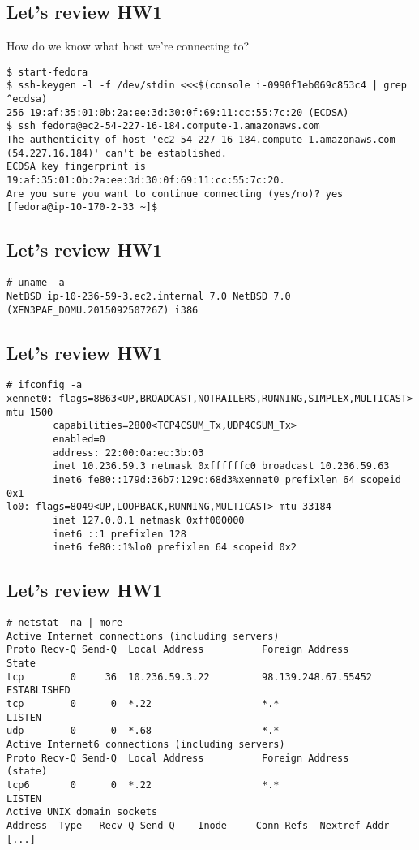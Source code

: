 \documentclass[xga]{xdvislides}
\begin{document}
\subsection{Let's review HW1}
\vspace{.5in}

How do we know what host we're connecting to?
\begin{verbatim}
$ start-fedora
$ ssh-keygen -l -f /dev/stdin <<<$(console i-0990f1eb069c853c4 | grep ^ecdsa)
256 19:af:35:01:0b:2a:ee:3d:30:0f:69:11:cc:55:7c:20 (ECDSA)
$ ssh fedora@ec2-54-227-16-184.compute-1.amazonaws.com
The authenticity of host 'ec2-54-227-16-184.compute-1.amazonaws.com
(54.227.16.184)' can't be established.
ECDSA key fingerprint is 19:af:35:01:0b:2a:ee:3d:30:0f:69:11:cc:55:7c:20.
Are you sure you want to continue connecting (yes/no)? yes
[fedora@ip-10-170-2-33 ~]$ 
\end{verbatim}

\subsection{Let's review HW1}
\begin{verbatim}
# uname -a
NetBSD ip-10-236-59-3.ec2.internal 7.0 NetBSD 7.0 (XEN3PAE_DOMU.201509250726Z) i386
\end{verbatim}

\subsection{Let's review HW1}
\begin{verbatim}
# ifconfig -a
xennet0: flags=8863<UP,BROADCAST,NOTRAILERS,RUNNING,SIMPLEX,MULTICAST> mtu 1500
        capabilities=2800<TCP4CSUM_Tx,UDP4CSUM_Tx>
        enabled=0
        address: 22:00:0a:ec:3b:03
        inet 10.236.59.3 netmask 0xffffffc0 broadcast 10.236.59.63
        inet6 fe80::179d:36b7:129c:68d3%xennet0 prefixlen 64 scopeid 0x1
lo0: flags=8049<UP,LOOPBACK,RUNNING,MULTICAST> mtu 33184
        inet 127.0.0.1 netmask 0xff000000
        inet6 ::1 prefixlen 128
        inet6 fe80::1%lo0 prefixlen 64 scopeid 0x2
\end{verbatim}


\subsection{Let's review HW1}
\begin{verbatim}
# netstat -na | more
Active Internet connections (including servers)
Proto Recv-Q Send-Q  Local Address          Foreign Address        State
tcp        0     36  10.236.59.3.22         98.139.248.67.55452    ESTABLISHED
tcp        0      0  *.22                   *.*                    LISTEN
udp        0      0  *.68                   *.*
Active Internet6 connections (including servers)
Proto Recv-Q Send-Q  Local Address          Foreign Address        (state)
tcp6       0      0  *.22                   *.*                    LISTEN
Active UNIX domain sockets
Address  Type   Recv-Q Send-Q    Inode     Conn Refs  Nextref Addr
[...]
\end{verbatim}
\end{document}

